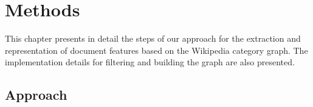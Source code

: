 \chapter{\hspace*{3pt} Methods}
\label{chapter:methodology}




This chapter presents in detail the steps of our approach for the extraction and representation of document features based on the Wikipedia category graph. The implementation details for filtering and building the graph are also presented.




\section{\hspace*{3pt} Approach} \label{sec:approach}

